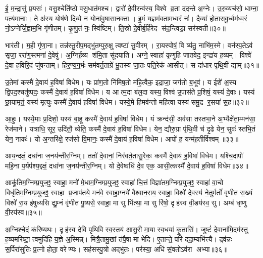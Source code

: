 ई॒ म॒न्द्रासु॑ प्र॒यसः॑। वसु॒श्चेति॑ष्ठो वसु॒धात॑मश्च। द्वारो॑ दे॒वीरन्व॑स्य॒ विश्वे व्र॒ता द॑दन्ते अ॒ग्नेः। उ॒रु॒व्यच॑सो॒ धाम्ना॒ पत्य॑मानाः। ते अ॑स्य॒ योष॑णे दि॒व्ये न योना॑वु॒षासा॒नक्ता। इ॒मं य॒ज्ञम॑वतामध्व॒रं नः॑। दैव्या॑ होतारावू॒र्ध्वम॑ध्व॒रं नो॒ऽग्नेर्जि॒ह्वाम॒भि गृ॑णीतम्। कृ॒णु॒तं नः॒ स्वि॑ष्टिम्। ति॒स्रो दे॒वीर्ब॒र्हिरेद स॑द॒न्त्विडा॒ सर॑स्वती॥३०॥

भार॑ती। म॒ही गृ॑णा॒ना। तन्न॑स्तु॒रीप॒मद्भु॑तम्पुरु॒क्षु त्वष्टा॑ सु॒वीरम्। रा॒यस्पोषं॒ वि ष्य॑तु॒ नाभि॑म॒स्मे। वन॑स्प॒तेऽव॑ सृजा॒ ररा॑ण॒स्त्मना॑ दे॒वेषु॑। अ॒ग्निर्\mbox{}ह॒व्य श॑मि॒ता सू॑दयाति। अग्ने॒ स्वाहा॑ कृणुहि जातवेद॒ इन्द्रा॑य ह॒व्यम्। विश्वे॑ दे॒वा ह॒विरि॒दं जु॑षन्ताम्। हि॒र॒ण्य॒ग॒र्भः सम॑वर्त॒ताग्रे॑ भू॒तस्य॑ जा॒तः पति॒रेक॑ आसीत्। स दा॑धार पृथि॒वीं द्याम्॥३१॥

उ॒तेमां कस्मै॑ दे॒वाय॑ ह॒विषा॑ विधेम। यः प्रा॑ण॒तो नि॑मिष॒तो म॑हि॒त्वैक॒ इद्राजा॒ जग॑तो ब॒भूव॑। य ईशे॑ अ॒स्य द्वि॒पद॒श्चतु॑ष्पदः॒ कस्मै॑ दे॒वाय॑ ह॒विषा॑ विधेम। य आत्म॒दा ब॑ल॒दा यस्य॒ विश्व॑ उ॒पास॑ते प्र॒शिषं॒ यस्य॑ दे॒वाः। यस्य॑ छा॒यामृतं॒ यस्य॑ मृ॒त्युः कस्मै॑ दे॒वाय॑ ह॒विषा॑ विधेम। यस्ये॒मे हि॒मव॑न्तो महि॒त्वा यस्य॑ समु॒द्र र॒सया॑ स॒ह॥३२॥

आ॒हुः। यस्ये॒माः प्र॒दिशो॒ यस्य॑ बा॒हू कस्मै॑ दे॒वाय॑ ह॒विषा॑ विधेम। यं क्रन्द॑सी॒ अव॑सा तस्तभा॒ने अ॒भ्यैक्षे॑ता॒म्मन॑सा॒ रेज॑माने। यत्राधि॒ सूर॒ उदि॑तौ॒ व्येति॒ कस्मै॑ दे॒वाय॑ ह॒विषा॑ विधेम। येन॒ द्यौरु॒ग्रा पृ॑थि॒वी च॑ दृ॒ढे येन॒ सुवः॑ स्तभि॒तं येन॒ नाकः॑। यो अ॒न्तरि॑क्षे॒ रज॑सो वि॒मानः॒ कस्मै॑ दे॒वाय॑ ह॒विषा॑ विधेम। आपो॑ ह॒ यन्म॑ह॒तीर्विश्वम्॥३३॥

आय॒न्दक्षं॒ दधा॑ना ज॒नय॑न्तीर॒ग्निम्। ततो॑ दे॒वानां॒ निर॑वर्त॒तासु॒रेकः॒ कस्मै॑ दे॒वाय॑ ह॒विषा॑ विधेम। यश्चि॒दापो॑ महि॒ना प॒र्यप॑श्य॒द्दक्षं॒ दधा॑ना ज॒नय॑न्तीर॒ग्निम्। यो दे॒वेष्वधि॑ दे॒व एक॒ आसी॒त्कस्मै॑ दे॒वाय॑ ह॒विषा॑ विधेम॥३४॥

{\anuvakamend[{अ॒ग्नेः स सर॑स्वती॒ द्या स॒ह विश्व॒ञ्चतु॑स्त्रिHशश्च॥८॥}]}

आकू॑तिम॒ग्निम्प्र॒युज॒ꣵ॒ स्वाहा॒ मनो॑ मे॒धाम॒ग्निम्प्र॒युज॒ꣵ॒ स्वाहा॑ चि॒त्तं विज्ञा॑तम॒ग्निम्प्र॒युज॒ꣵ॒ स्वाहा॑ वा॒चो विधृ॑तिम॒ग्निम्प्र॒युज॒ꣵ॒ स्वाहा प्र॒जाप॑तये॒ मन॑वे॒ स्वाहा॒ग्नये॑ वैश्वान॒राय॒ स्वाहा॒ विश्वे॑ दे॒वस्य॑ ने॒तुर्मर्तो॑ वृणीत स॒ख्यं विश्वे॑ रा॒य इ॑षुध्यसि द्यु॒म्नं वृ॑णीत पु॒ष्यसे॒ स्वाहा॒ मा सु भि॑त्था॒ मा सु रि॑षो॒ दृह॑स्व वी॒डय॑स्व॒ सु। अम्ब॑ धृष्णु वी॒रय॑स्व॥३५॥

अ॒ग्निश्चे॒दं क॑रिष्यथः। दृह॑स्व देवि पृथिवि स्व॒स्तय॑ आसु॒री मा॒या स्व॒धया॑ कृ॒तासि॑। जुष्टं॑ दे॒वाना॑मि॒दम॑स्तु ह॒व्यमरि॑ष्टा॒ त्वमुदि॑हि य॒ज्ञे अ॒स्मिन्न्। मित्रै॒तामु॒खां त॑पै॒षा मा भे॑दि। ए॒तान्ते॒ परि॑ ददा॒म्यभि॑त्त्यै। द्र्व॑न्नः स॒र्पिरा॑सुतिः प्र॒त्नो होता॒ वरेण्यः। सह॑सस्पु॒त्रो अद्भु॑तः। पर॑स्या॒ अधि॑ सं॒वतोऽव॑रा अभ्या॥३६॥


